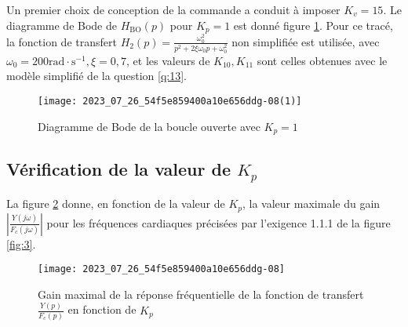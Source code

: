 
Un premier choix de conception de la commande a conduit à imposer $K_{v}=15$. Le diagramme de Bode de $H_{\mathrm{BO}}(p)$ pour $K_{p}=1$ est donné figure \ref{fig:12}. Pour ce tracé, la fonction de transfert $H_{2}(p)=\frac{\omega_{0}^{2}}{p^{2}+2 \xi \omega_{0} p+\omega_{0}^{2}}$ non simplifiée est utilisée, avec $\omega_{0}=200 \mathrm{rad} \cdot \mathrm{s}^{-1}, \xi=0,7$, et les valeurs de $K_{10}, K_{11}$ sont celles obtenues avec le modèle simplifié de la question \ref{q:13}.


\begin{figure}[!h]
\centering
\texttt{[image: 2023\_07\_26\_54f5e859400a10e656ddg-08(1)]}
\caption{\label{fig:12}Diagramme de Bode de la boucle ouverte avec $K_{p}=1$}
\end{figure}


\subsection{\label{sec:III.B} Vérification de la valeur de $K_{p}$}

La figure \ref{fig:13} donne, en fonction de la valeur de $K_{p}$, la valeur maximale du gain $\left|\frac{Y(j \omega)}{F_{c}(j \omega)}\right|$ pour les fréquences cardiaques précisées par l'exigence 1.1.1 de la figure \ref{fig:3}.


\begin{figure}[!h]
\centering
\texttt{[image: 2023\_07\_26\_54f5e859400a10e656ddg-08]}
\caption{\label{fig:13}Gain maximal de la réponse fréquentielle de la fonction de transfert $\frac{Y(p)}{F_{c}(p)}$ en fonction de $K_{p}$}
\end{figure}


